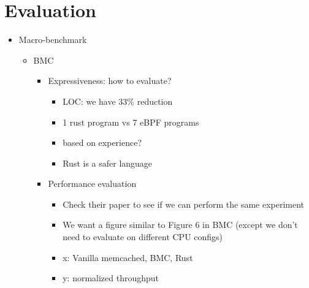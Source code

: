 \section{Evaluation}

\begin{itemize}
    \item Macro-benchmark
        \begin{itemize}
            \item BMC
                \begin{itemize}
                    \item Expressiveness: how to evaluate?
                        \begin{itemize}
                            \item LOC: we have 33\% reduction
                            \item 1 rust program vs 7 eBPF programs
                            \item based on experience?
                            \item Rust is a safer language
                        \end{itemize}
                    \item Performance evaluation
                        \begin{itemize}
                            \item Check their paper to see if we can perform
                                the same experiment
                            \item We want a figure similar to Figure 6 in BMC
                                (except we don't need to evaluate on different
                                CPU configs)
                            \item x: Vanilla memcached, BMC, Rust
                            \item y: normalized throughput


\end{itemize}
\end{itemize}
\end{itemize}
\end{itemize}
